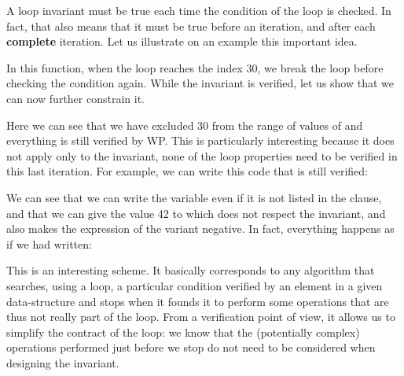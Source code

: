 

A loop invariant must be true each time the condition of the loop is checked. In
fact, that also means that it must be true before an iteration, and after
each \textbf{complete} iteration. Let us illustrate on an example this
important idea.






In this function, when the loop reaches the index 30, we break the loop before
checking the condition again. While the invariant is verified, let us show
that we can now further constrain it.






Here we can see that we have excluded 30 from the range of values of
 and everything is still verified by WP. This is particularly
interesting because it does not apply only to the invariant, none of the loop
properties need to be verified in this last iteration. For example, we can
write this code that is still verified:






We can see that we can write the variable  even if it is not
listed in the  clause, and that we can give the
value 42 to  which does not respect the invariant, and also
makes the expression of the variant negative. In fact, everything happens
as if we had written:






This is an interesting scheme. It basically corresponds to any algorithm
that searches, using a loop, a particular condition verified by an element
in a given data-structure and stops when it founds it to perform some
operations that are thus not really part of the loop. From a verification
point of view, it allows us to simplify the contract of the loop: we know
that the (potentially complex) operations performed just before we stop do
not need to be considered when designing the invariant.





